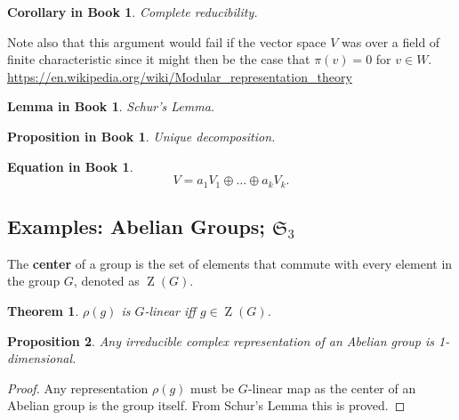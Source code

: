 \documentclass[12pt, letterpaper]{article}
\newcommand{\ZZ}{\operatorname{Z}}
\newcommand{\red}[1]{{\color{red} #1}}
\newtheorem{prop}{Proposition}[section]
\newtheorem{thm}[prop]{Theorem}
\theoremstyle{definition}
\theoremstyle{remark}
\theoremstyle{definition}
\newtheorem{eq}[exe]{Equation in Book}
\theoremstyle{plain}
\newtheorem{pprop}[exe]{Proposition in Book}
\newtheorem{ccor}[exe]{Corollary in Book}
\newtheorem{llem}[exe]{Lemma in Book}
\numberwithin{equation}{section}
\begin{document}
	\begin{ccor}
		Complete reducibility.
	\end{ccor}
	\red{
	Note also 
	that this argument would fail if the vector space $V$ was over a field of finite 
	characteristic since it might then be the case that $\pi(v) = 0$ for $v \in W$.
	}
	\url{https://en.wikipedia.org/wiki/Modular_representation_theory}
	\begin{llem}\label{llemSchur}
		Schur's Lemma.
	\end{llem}
	\begin{pprop}\label{ppropUniqueDecomp}
		Unique decomposition.
	\end{pprop}
	\begin{eq}
		\[V=a_1V_1\oplus\dots\oplus a_kV_k.\]
	\end{eq}
	\subsection{Examples: Abelian Groups; $\mathfrak{S}_3$}
	\begin{def*}[center]
		 The \textbf{center} of a group is the set of elements that commute with every element in the group $G$,
		 denoted as $\ZZ(G)$.
	\end{def*}
	\begin{thm}
		$\rho(g)$ is $G$-linear iff $g \in \ZZ(G)$.
	\end{thm}
	\begin{prop}
		Any irreducible complex representation of an Abelian group is 1-dimensional.
	\end{prop}
	\begin{proof}
		Any representation $\rho(g)$ must be $G$-linear map as the center of an Abelian group is the group itself.
		From Schur's Lemma this is proved.
	\end{proof}
\end{document}
